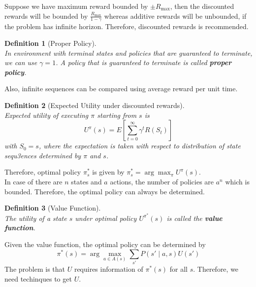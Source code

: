 \documentclass[12pt]{article}
\newtheorem{definition}{Definition}[section]
\theoremstyle{definition}
\begin{document}
Suppose we have maximum reward bounded by $\pm R_{\max}$, then the discounted rewards will be bounded by $\frac{R_{\max}}{1-\gamma}$ whereas additive rewards will be unbounded, if the problem has infinite horizon. Therefore, discounted rewards is recommended.
\begin{definition}[Proper Policy]
\hfill\\\normalfont In environment with terminal states and policies that are guaranteed to terminate, we can use $\gamma=1$. A policy that is guaranteed to terminate is called \textbf{proper policy}.\\
\end{definition}
Also, infinite sequences can be compared using average reward per unit time.
\begin{definition}[Expected Utility under discounted rewards]
\hfill\\\normalfont Expected utility of executing $\pi$ starting from $s$ is
\[
U^\pi(s)=E[\sum_{t=0}^\infty \gamma^t R(S_t)]
\]
with $S_0=s$, where the expectation is taken with respect to distribution of state sequ3ences determined by $\pi$ and $s$.
\end{definition}
Therefore, optimal policy $\pi_s^\ast$ is given by $\pi_s^\ast=\arg\max_{\pi} U^{\pi}(s)$.\\
In case of there are $n$ states and $a$ actions, the number of policies are $a^n$ which is bounded. Therefore, the optimal policy can always be determined.
\begin{definition}[Value Function]
\hfill\\\normalfont The utility of a state $s$ under optimal policy $U^{\pi^\ast}(s)$ is called the \textbf{value function}.
\end{definition}
Given the value function, the optimal policy can be determined by
\[
\pi^\ast(s)=\arg\max_{a\in A(s)}\sum_{s'} P(s'\mid a,s)U(s')
\]
The problem is that $U$ requires information of $\pi^\ast(s)$ for all $s$. Therefore, we need techinques to get $U$.
\end{document}
